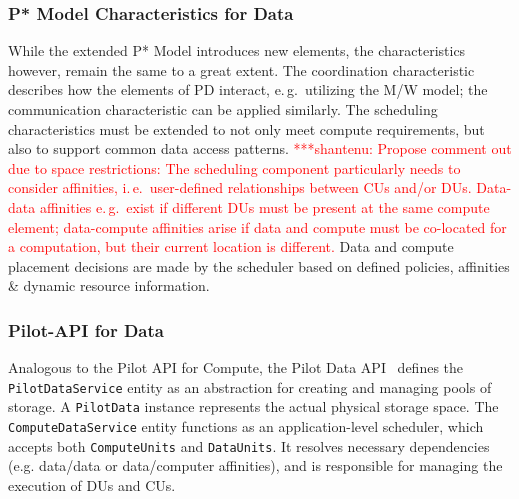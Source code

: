 \documentclass[conference,final]{IEEEtran}
\newcommand{\jhanote}[1]{ {\textcolor{red} { ***shantenu: #1 }}}
\newcommand{\jhanote}[1]{}
\newcommand{\cus}{CUs\xspace}
\newcommand{\dus}{DUs\xspace}
\begin{document}
\subsubsection*{P* Model Characteristics for Data}

While the extended P* Model introduces new elements, the
characteristics however, remain the same to a great extent. The
coordination characteristic describes how the elements of PD interact,
e.\,g.\ utilizing the M/W model; the communication characteristic can
be applied similarly. The scheduling characteristics must be extended
to not only meet compute requirements, but also to support common data
access patterns. \jhanote{Propose comment out due to space
  restrictions: The scheduling component particularly needs to
  consider affinities, i.\,e.\ user-defined relationships between \cus
  and/or \dus. Data-data affinities e.\,g.\ exist if different \dus
  must be present at the same compute element; data-compute affinities
  arise if data and compute must be co-located for a computation, but
  their current location is different.} Data and compute placement
decisions are made by the scheduler based on defined policies,
affinities \& dynamic resource information.


\subsubsection*{Pilot-API for Data} 
Analogous to the Pilot API for Compute, the Pilot Data API~\cite{pilot_api} 
defines the \texttt{PilotDataService} entity as an abstraction for creating and
managing pools of storage. A \texttt{PilotData} instance represents the actual
physical storage space. The \texttt{ComputeDataService} entity
functions as an application-level scheduler, which accepts both
\texttt{ComputeUnits} and \texttt{DataUnits}. It resolves necessary
dependencies (e.g. data/data or data/computer affinities), and is
responsible for managing the execution of \dus and \cus.



% 
% 

\end{document}
